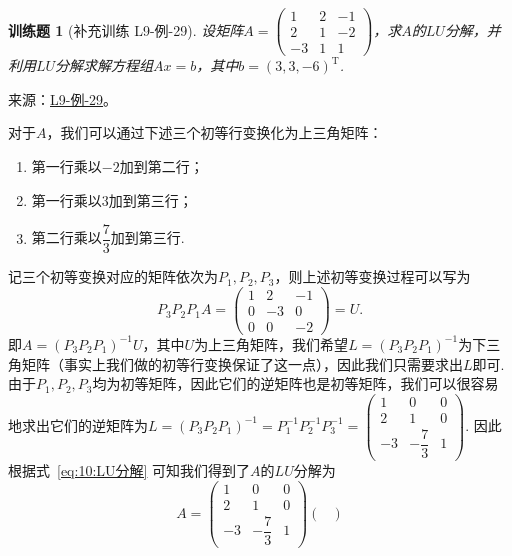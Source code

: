 \documentclass[12pt,fontset=fandol]{ctexart}
\newtheorem{exercise}{训练题}[section]
\begin{document}
\begin{exercise}[补充训练 L9-例-29]\label{prob:L9-例-29}
设矩阵$A=\begin{pmatrix}
            1 & 2 & -1 \\ 2 & 1 & -2 \\ -3 & 1 & 1
        \end{pmatrix}$，求$A$的$LU$分解，并利用$LU$分解求解方程组$Ax=b$，其中$b=(3,3,-6)^\mathrm{T}$.
\end{exercise}
\noindent 来源：\href{https://github.com/yhwu-is/Linear-Algebra-Left-Undone/blob/new/%E8%AE%B2%E4%B9%89/%E4%B8%93%E9%A2%98/9%20%E7%9F%A9%E9%98%B5%E8%BF%90%E7%AE%97%E8%BF%9B%E9%98%B6.tex}{L9-例-29}。
\begin{solve}
对于$A$，我们可以通过下述三个初等行变换化为上三角矩阵：
    \begin{enumerate}
        \item 第一行乘以$-2$加到第二行；
        \item 第一行乘以$3$加到第三行；
        \item 第二行乘以$\dfrac{7}{3}$加到第三行.
    \end{enumerate}
    记三个初等变换对应的矩阵依次为$P_1,P_2,P_3$，则上述初等变换过程可以写为
    \begin{equation}\label{eq:10:LU分解}
        P_3P_2P_1A=\begin{pmatrix}
            1 & 2 & -1 \\ 0 & -3 & 0 \\ 0 & 0 & -2
        \end{pmatrix}=U.
    \end{equation}
    即$A=(P_3P_2P_1)^{-1}U$，其中$U$为上三角矩阵，我们希望$L=(P_3P_2P_1)^{-1}$为下三角矩阵（事实上我们做的初等行变换保证了这一点），因此我们只需要求出$L$即可. 由于$P_1,P_2,P_3$均为初等矩阵，因此它们的逆矩阵也是初等矩阵，我们可以很容易地求出它们的逆矩阵为$L=(P_3P_2P_1)^{-1}=P_1^{-1}P_2^{-1}P_3^{-1}=\begin{pmatrix}
            1 & 0 & 0 \\ 2 & 1 & 0 \\ -3 & -\dfrac{7}{3} & 1
        \end{pmatrix}$. 因此根据式~\eqref{eq:10:LU分解} 可知我们得到了$A$的$LU$分解为
    \[A=\begin{pmatrix}
            1 & 0 & 0 \\ 2 & 1 & 0 \\ -3 & -\dfrac{7}{3} & 1
        \end{pmatrix}\begin{pmatrix}

\end{pmatrix}\]
\end{solve}
\end{document}
